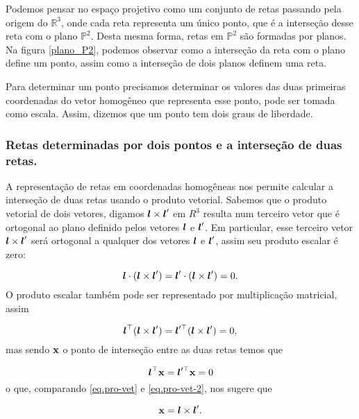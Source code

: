 Podemos pensar no espaço projetivo como um conjunto de retas passando pela origem do $\mathbb{R}^3$, onde cada reta representa um único ponto, que é a interseção desse reta com o plano $\mathbb{P}^2$. Desta mesma forma, retas em $\mathbb{P}^2$ são formadas por planos. Na figura \ref{plano_P2}, podemos observar como a interseção da reta com o plano define um ponto, assim como a interseção de dois planos definem uma reta.


Para determinar um ponto precisamos determinar os valores das duas primeiras coordenadas do vetor homogêneo que representa esse ponto, pode ser tomada como escala. Assim, dizemos que um ponto tem dois graus de liberdade.
\\

\subsubsection{Retas determinadas por dois pontos e a interseção de duas retas.}

A representação de retas em coordenadas homogêneas nos permite calcular a interseção de duas retas usando o produto vetorial. Sabemos que o produto vetorial de dois vetores, digamos $\boldsymbol{l}\times\boldsymbol{l}'$ em $R^3$ resulta num terceiro vetor que é ortogonal ao plano definido pelos vetores $\boldsymbol{l}$ e $\boldsymbol{l}'$. Em particular, esse terceiro vetor $\boldsymbol{l}\times\boldsymbol{l}'$ será ortogonal a qualquer dos vetores $\boldsymbol{l}$ e $\boldsymbol{l}'$, assim seu produto escalar é zero:

\begin{equation*}
\boldsymbol{l}\cdot(\boldsymbol{l}\times\boldsymbol{l}')=\boldsymbol{l}'\cdot(\boldsymbol{l}\times\boldsymbol{l}')=0.
\end{equation*}
O produto escalar também pode ser representado por multiplicação matricial, assim

\begin{equation}\label{eq.pro-vet}
\boldsymbol{l}^\top(\boldsymbol{l}\times\boldsymbol{l}')=\boldsymbol{l}'^\top(\boldsymbol{l}\times\boldsymbol{l}')=0,
\end{equation}
mas sendo $\mathbf{x}$ o ponto de interseção entre as duas retas temos que

\begin{equation}\label{eq.pro-vet-2}
\boldsymbol{l}^\top\mathbf{x}=\boldsymbol{l}'^\top\mathbf{x}=0
\end{equation}
o que, comparando \ref{eq.pro-vet} e \ref{eq.pro-vet-2}, nos sugere que

\begin{equation*}
\mathbf{x}=\boldsymbol{l}\times\boldsymbol{l}'.
\end{equation*}


